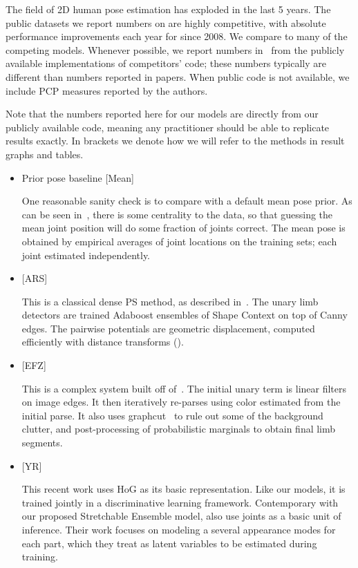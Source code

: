 The field of 2D human pose estimation has exploded in the last 5 years.  The 
public datasets we report numbers on are highly competitive, with absolute 
performance improvements each year for since 2008.  We compare to many of the 
competing models.  Whenever possible, we report numbers in~ 
from the publicly available implementations of competitors' code; these numbers 
typically are different than numbers reported in papers.  When public code is 
not available, we include PCP measures reported by the authors.

Note that the numbers reported here for our models are directly from our 
publicly available code, meaning any practitioner should be able to replicate 
results exactly. In brackets we denote how we will refer to the methods in 
result graphs and tables.

\begin{itemize}
\item Prior pose baseline [Mean]

One reasonable sanity check is to compare with a default mean pose prior.  As 
can be seen in~, there is some centrality to the 
data, so that guessing the mean joint position will do some fraction of joints 
correct.  The mean pose is obtained by empirical averages of joint locations on 
the training sets; each joint estimated independently.

\item \citet{andriluka09} [ARS] 

This is a classical dense PS method, as described in~.  The unary 
limb detectors are trained Adaboost ensembles of Shape Context on top of Canny 
edges.  The pairwise potentials are geometric displacement, computed 
efficiently with distance transforms ().

\item \citet{eichner09} [EFZ]

This is a complex system built off of~\citet{devacrf}.  The initial unary term 
is linear filters on image edges.  It then iteratively re-parses using color 
estimated from the initial parse.  It also uses graphcut~\citep{boykov2001} to 
rule out some of the background clutter, and post-processing of probabilistic 
marginals to obtain final limb segments.

\item \citet{deva2011} [YR]

This recent work uses HoG as its basic representation.  Like our models, it is 
trained jointly in a discriminative learning framework.  Contemporary with our 
proposed Stretchable Ensemble model, \citet{deva2011} also use joints as a 
basic unit of inference.  Their work focuses on modeling a several appearance 
modes for each part, which they treat as latent variables to be estimated 
during training.  \end{itemize}



